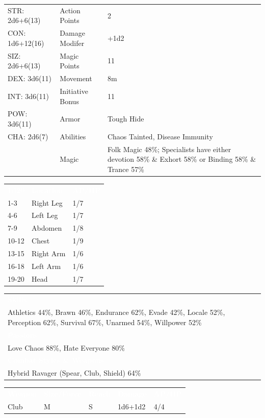 \documentclass[letterpaper,serif]{rpg-module}
\begin{document}
\begin{tabularx}{\linewidth}{XXX}
STR: 2d6+6(13) & Action Points & 2 \\
CON: 1d6+12(16) & Damage Modifer & +1d2 \\
SIZ: 2d6+6(13) & Magic Points & 11 \\
DEX: 3d6(11) & Movement & 8m \\
INT: 3d6(11) & Initiative Bonus & 11 \\
POW: 3d6(11) & Armor & Tough Hide \\
CHA: 2d6(7) & Abilities & Chaos Tainted, Disease Immunity \\
    & Magic & Folk Magic 48\%; Specialists have either devotion 58\% \& Exhort 58\% or Binding 58\% \& Trance 57\%
\end{tabularx}

\begin{tabularx}{\linewidth}{XXX}
\rowcolor{gray}
\textcolor{white}{\textbf{1d20}} & \textcolor{white}{\textbf{Location}} & \textcolor{white}{\textbf{AP/HP}} \\
1-3 & Right Leg & 1/7 \\
4-6 & Left Leg & 1/7 \\
7-9 & Abdomen & 1/8 \\
10-12 & Chest & 1/9 \\
13-15 & Right Arm & 1/6 \\
16-18 & Left Arm & 1/6 \\
19-20 & Head & 1/7 
\end{tabularx}

\begin{tabularx}{\linewidth}{X}
\rowcolor{gray}
\textcolor{white}{\textbf{Skills}} \\
Athletics 44\%, Brawn 46\%, Endurance 62\%, Evade 42\%, Locale 52\%, Perception 62\%, Survival 67\%, Unarmed 54\%, Willpower 52\%\\
\rowcolor{gray}
\textcolor{white}{\textbf{Passions}} \\
Love Chaos 88\%, Hate Everyone 80\% \\
\rowcolor{gray}
\textcolor{white}{\textbf{Combat Styles \& Weapons}} \\
Hybrid Ravager (Spear, Club, Shield) 64\%
\end{tabularx}

\begin{tabularx}{\linewidth}{XXXXX}
\rowcolor{gray}
\textcolor{white}{\textbf{Weapon}} & \textcolor{white}{\textbf{Size/Force}} & \textcolor{white}{\textbf{Reach}} & \textcolor{white}{\textbf{Damage}} & \textcolor{white}{\textbf{AP/HP}} \\
Club & M & S & 1d6+1d2 & 4/4
\end{tabularx}
\end{document}
